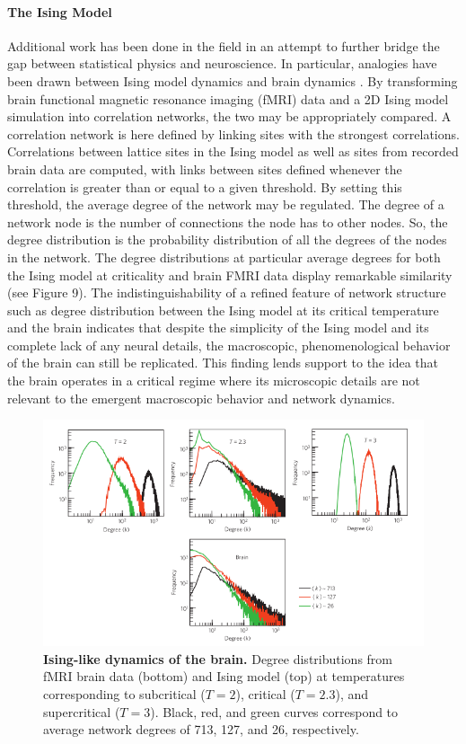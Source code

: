 \documentclass[12pt]{article}
\begin{document}
\paragraph{The Ising Model}
Additional work has been done in the field in an attempt to further bridge the gap between statistical physics and neuroscience. In particular, analogies have been drawn between Ising model dynamics and brain dynamics \cite{Fraiman2009a}. By transforming brain functional magnetic resonance imaging (fMRI) data and a 2D Ising model simulation into correlation networks, the two may be appropriately compared. A correlation network is here defined by linking sites with the strongest correlations. Correlations between lattice sites in the Ising model as well as sites from recorded brain data are computed, with links between sites defined whenever the correlation is greater than or equal to a given threshold. By setting this threshold, the average degree of the network may be regulated. The degree of a network node is the number of connections the node has to other nodes. So, the degree distribution is the probability distribution of all the degrees of the nodes in the network. The degree distributions at particular average degrees for both the Ising model at criticality and brain FMRI data display remarkable similarity (see Figure 9). The indistinguishability of a refined feature of network structure such as degree distribution between the Ising model at its critical temperature and the brain indicates that despite the simplicity of the Ising model and its complete lack of any neural details, the macroscopic, phenomenological behavior of the brain can still be replicated. This finding lends support to the idea that the brain operates in a critical regime where its microscopic details are not relevant to the emergent macroscopic behavior and network dynamics.

\begin{figure}      
  \begin{center}    
 \includegraphics[width=.8\textwidth]{isinglikedynamicschialvo}    
    \caption{\textbf{Ising-like dynamics of the brain.} Degree distributions from fMRI brain data (bottom) and Ising model (top) at temperatures corresponding to subcritical ($T=2$), critical ($T=2.3$), and supercritical ($T=3$). Black, red, and green curves correspond to average network degrees of 713, 127, and 26, respectively. \cite{Fraiman2009a}}   
   \label{Figure::Ising model and the brain at criticality}   
  \end{center}     
   \end{figure}
\end{document}
